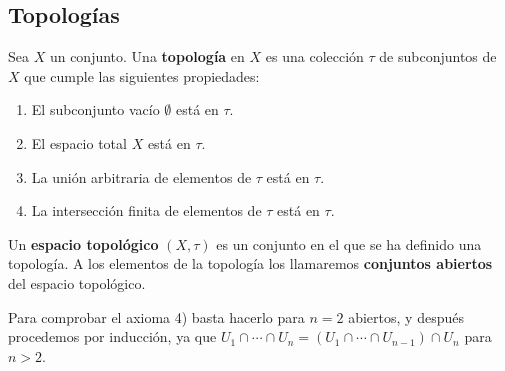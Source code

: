 \subsection{Topologías}

\begin{definición}[Topología]
    Sea $X$ un conjunto. Una \textbf{topología} en $X$ es una colección $\tau$ de subconjuntos de $X$ que cumple las siguientes propiedades:
    \begin{enumerate}
        \item El subconjunto vacío $\emptyset$ está en $\tau$.
        \item El espacio total $X$ está en $\tau$.
        \item La unión arbitraria de elementos de $\tau$ está en $\tau$.
        \item La intersección finita de elementos de $\tau$ está en $\tau$.
    \end{enumerate}
    Un \textbf{espacio topológico} $(X, \tau)$ es un conjunto en el que se ha definido una topología. A los elementos de la topología los llamaremos \textbf{conjuntos abiertos} del espacio topológico.
\end{definición}

\begin{observación}
    Para comprobar el axioma 4) basta hacerlo para $n = 2$ abiertos, y después procedemos por inducción, ya que $U_1 \cap \cdots \cap U_n = (U_1 \cap \cdots \cap U_{n-1}) \cap U_n$ para $n > 2$.
\end{observación}



